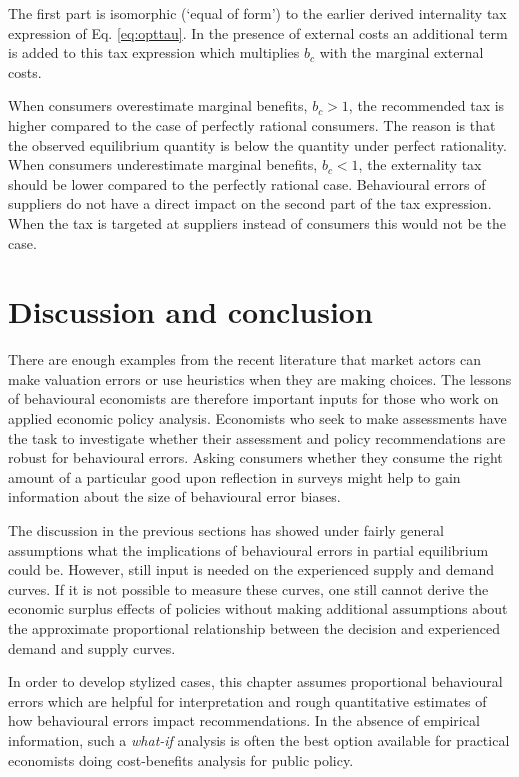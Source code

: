 \documentclass[
]{book}
\begin{document}
The first part is isomorphic (`equal of form') to the earlier derived internality tax expression of Eq. \eqref{eq:opttau}. In the presence of external costs an additional term is added to this tax expression which multiplies \(b_c\) with the marginal external costs.

When consumers overestimate marginal benefits, \(b_c>1\), the recommended tax is higher compared to the case of perfectly rational consumers. The reason is that the observed equilibrium quantity is below the quantity under perfect rationality.
When consumers underestimate marginal benefits, \(b_c<1\), the externality tax should be lower compared to the perfectly rational case. Behavioural errors of suppliers do not have a direct impact on the second part of the tax expression. When the tax is targeted at suppliers instead of consumers this would not be the case.

\hypertarget{discussion-and-conclusion}{%
\section{Discussion and conclusion}\label{discussion-and-conclusion}}

There are enough examples from the recent literature that market actors can make valuation errors or use heuristics when they are making choices. The lessons of behavioural economists are therefore important inputs for those who work on applied economic policy analysis. Economists who seek to make assessments have the task to investigate whether their assessment and policy recommendations are robust for behavioural errors. Asking consumers whether they consume the right amount of a particular good upon reflection in surveys might help to gain information about the size of behavioural error biases.

The discussion in the previous sections has showed under fairly general assumptions what the implications of behavioural errors in partial equilibrium could be. However, still input is needed on the experienced supply and demand curves. If it is not possible to measure these curves, one still cannot derive the economic surplus effects of policies without making additional assumptions about the approximate proportional relationship between the decision and experienced demand and supply curves.

In order to develop stylized cases, this chapter assumes proportional behavioural errors which are helpful for interpretation and rough quantitative estimates of how behavioural errors impact recommendations. In the absence of empirical information, such a \emph{what-if} analysis is often the best option available for practical economists doing cost-benefits analysis for public policy.
\end{document}
